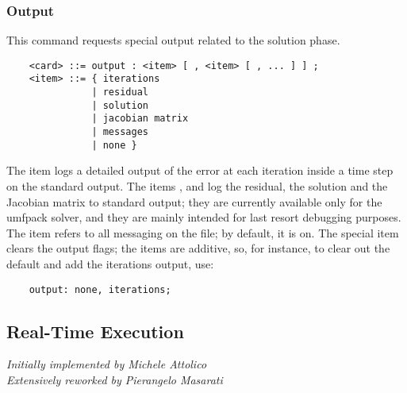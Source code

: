 \subsubsection{Output}
This command requests special output related to the solution phase.
\begin{verbatim}
    <card> ::= output : <item> [ , <item> [ , ... ] ] ;
    <item> ::= { iterations
               | residual
               | solution
               | jacobian matrix
               | messages
               | none }
\end{verbatim}
The item  logs a detailed output of the error
at each iteration inside a time step 
on the standard output.
The items ,  and  log
the residual, the solution and the Jacobian matrix to standard output;
they are currently available only for the umfpack solver, and they are
mainly intended for last resort debugging purposes.
The item  refers to all messaging 
on the  file; by default, it is on.
The special item  clears the output flags; the items
are additive, so, for instance, to clear out the default 
and add the iterations output, use:
\begin{verbatim}
    output: none, iterations;
\end{verbatim}



\subsection{Real-Time Execution}\label{sec:REAL-TIME}
\emph{Initially implemented by Michele Attolico} \\
\emph{Extensively reworked by Pierangelo Masarati}

